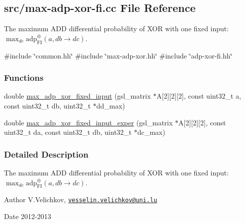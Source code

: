 \hypertarget{max-adp-xor-fi_8cc}{\subsection{src/max-\/adp-\/xor-\/fi.cc \-File \-Reference}
\label{max-adp-xor-fi_8cc}
}


\-The maximum \-A\-D\-D differential probability of \-X\-O\-R with one fixed input\-: $\max_{dc} \mathrm{adp}^{\oplus}_{\mathrm{FI}}(a, db \rightarrow dc)$.  


{\ttfamily \#include \char`\"{}common.\-hh\char`\"{}}\*
{\ttfamily \#include \char`\"{}max-\/adp-\/xor.\-hh\char`\"{}}\*
{\ttfamily \#include \char`\"{}adp-\/xor-\/fi.\-hh\char`\"{}}\*
\subsubsection*{\-Functions}
\begin{DoxyCompactItemize}
\item 
double \hyperlink{max-adp-xor-fi_8cc_ab2a3ba6507c5a4b456487c3f8009511b}{max\-\_\-adp\-\_\-xor\-\_\-fixed\-\_\-input} (gsl\-\_\-matrix $\ast$\-A\mbox{[}2\mbox{]}\mbox{[}2\mbox{]}\mbox{[}2\mbox{]}, const uint32\-\_\-t a, const uint32\-\_\-t db, uint32\-\_\-t $\ast$dd\-\_\-max)
\item 
double \hyperlink{max-adp-xor-fi_8cc_a89f21fea615e80c454283ef53d463668}{max\-\_\-adp\-\_\-xor\-\_\-fixed\-\_\-input\-\_\-exper} (gsl\-\_\-matrix $\ast$\-A\mbox{[}2\mbox{]}\mbox{[}2\mbox{]}\mbox{[}2\mbox{]}, const uint32\-\_\-t da, const uint32\-\_\-t db, uint32\-\_\-t $\ast$dc\-\_\-max)
\end{DoxyCompactItemize}


\subsubsection{\-Detailed \-Description}
\-The maximum \-A\-D\-D differential probability of \-X\-O\-R with one fixed input\-: $\max_{dc} \mathrm{adp}^{\oplus}_{\mathrm{FI}}(a, db \rightarrow dc)$. \begin{DoxyAuthor}{\-Author}
\-V.\-Velichkov, \href{mailto:vesselin.velichkov@uni.lu}{\tt vesselin.\-velichkov@uni.\-lu} 
\end{DoxyAuthor}
\begin{DoxyDate}{\-Date}
2012-\/2013 
\end{DoxyDate}


